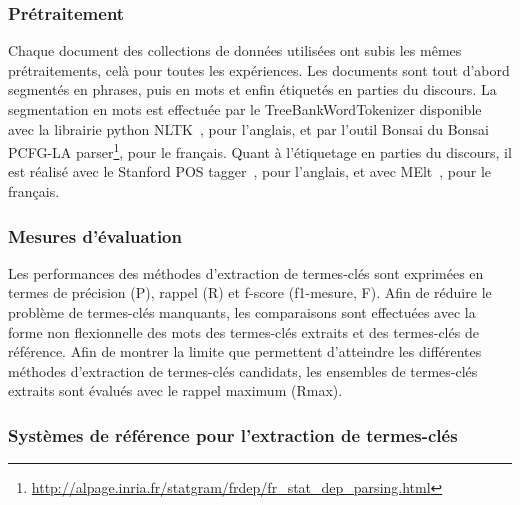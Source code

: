     \subsubsection{Prétraitement}
    \label{subsubsec:pretraitement}
      Chaque document des collections de données utilisées ont subis les mêmes
      prétraitements, celà pour toutes les expériences. Les documents sont tout
      d'abord segmentés en phrases, puis en mots et enfin étiquetés en parties
      du discours. La segmentation en mots est effectuée par le
      TreeBankWordTokenizer disponible avec la librairie python
      NLTK~\cite[\textit{Natural Language ToolKit}]{bird2009nltk}, pour
      l'anglais, et par l'outil Bonsai du Bonsai PCFG-LA
      parser\footnote{\url{http://alpage.inria.fr/statgram/frdep/fr\_stat\_dep\_parsing.html}},
      pour le français. Quant à l'étiquetage en parties du discours, il est
      réalisé avec le Stanford POS tagger~\cite{toutanova2003stanfordpostagger},
      pour l'anglais, et avec MElt~\cite{denis2009melt}, pour le français.

    \subsubsection{Mesures d'évaluation}
    \label{subsubsec:mesures_d_evaluation}
      Les performances des méthodes d'extraction de termes-clés sont exprimées
      en termes de précision (P), rappel (R) et f-score (f1-mesure, F). Afin de
      réduire le problème de termes-clés manquants, les comparaisons sont
      effectuées avec la forme non flexionnelle des mots des termes-clés
      extraits et des termes-clés de référence. Afin de montrer la limite que
      permettent d'atteindre les différentes méthodes d'extraction de
      termes-clés candidats, les ensembles de termes-clés extraits sont évalués
      avec le rappel maximum (Rmax).

    \subsubsection{Systèmes de référence pour l'extraction de termes-clés}
    \label{subsubsec:systemes_de_reference_pour_l_extraction_de_termes_cles}

